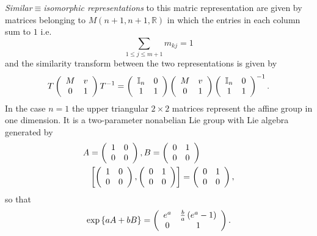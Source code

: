 \documentclass[aps,preprint]{revtex4}%
\begin{document}
\emph{Similar}$\equiv$\emph{isomorphic representations} to this matric
representation are given by matrices belonging to $M\left(  n+1,n+1,\mathbb{R}%
\right)  $ in which the entries in each column sum to $1$ i.e.%
\begin{equation}
\sum_{1\leq j\leq m+1}m_{kj}=1
\end{equation}
and the similarity transform between the two representations is given by
\begin{equation}
T\left(
\begin{array}
[c]{cc}%
M & v\\
0 & 1
\end{array}
\right)  T^{-1}=\left(
\begin{array}
[c]{cc}%
\mathbb{I}_{n} & 0\\
1 & 1
\end{array}
\right)  \left(
\begin{array}
[c]{cc}%
M & v\\
0 & 1
\end{array}
\right)  \left(
\begin{array}
[c]{cc}%
\mathbb{I}_{n} & 0\\
1 & 1
\end{array}
\right)  ^{-1}.
\end{equation}
In the case $n=1$ the upper triangular $2\times2$ matrices represent the
affine group in one dimension. It is a two-parameter nonabelian Lie group with
Lie algebra generated by
\begin{align}
A  &  =\left(
\begin{array}
[c]{cc}%
1 & 0\\
0 & 0
\end{array}
\right)  ,B=\left(
\begin{array}
[c]{cc}%
0 & 1\\
0 & 0
\end{array}
\right) \\
&  \left[  \left(
\begin{array}
[c]{cc}%
1 & 0\\
0 & 0
\end{array}
\right)  ,\left(
\begin{array}
[c]{cc}%
0 & 1\\
0 & 0
\end{array}
\right)  \right]  =\left(
\begin{array}
[c]{cc}%
0 & 1\\
0 & 0
\end{array}
\right)  ,
\end{align}
so that
\begin{equation}
\exp\left\{  aA+bB\right\}  =\left(
\begin{array}
[c]{cc}%
e^{a} & \frac{b}{a}\left(  e^{a}-1\right) \\
0 & 1
\end{array}
\right)  .
\end{equation}
\end{document}
